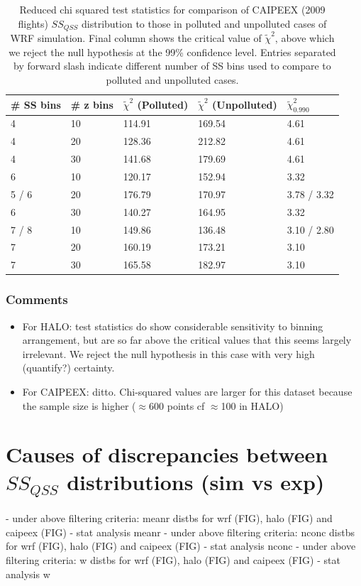 \documentclass{article}
\begin{document}
\begin{table}[ht]
\centering
\begin{tabular}{@{}lllll@{}}
\toprule
\textbf{\# SS bins} & \textbf{\# z bins} & \textbf{$\tilde\chi^2$ (Polluted)} & \textbf{$\tilde\chi^2$ (Unpolluted)} & \textbf{$\tilde\chi^2_{0.990}$} \\ \midrule
4 & 10 & 114.91 & 169.54 & 4.61 \\
4 & 20 & 128.36 & 212.82 & 4.61 \\
4 & 30 & 141.68 & 179.69 & 4.61 \\
6 & 10 & 120.17 & 152.94 & 3.32 \\
5 / 6 & 20 & 176.79 & 170.97 & 3.78 / 3.32 \\
6 & 30 & 140.27 & 164.95 & 3.32 \\
7 / 8 & 10 & 149.86 & 136.48 & 3.10 / 2.80 \\
7 & 20 & 160.19 & 173.21 & 3.10 \\
7 & 30 & 165.58 & 182.97 & 3.10 \\ \bottomrule
\end{tabular}
\caption{Reduced chi squared test statistics for comparison of CAIPEEX (2009 flights) $SS_{QSS}$ distribution to those in polluted and unpolluted cases of WRF simulation. Final column shows the critical value of $\tilde\chi^2$, above which we reject the null hypothesis at the 99\% confidence level. Entries separated by forward slash indicate different number of SS bins used to compare to polluted and unpolluted cases.}
\label{caipeexchisqtable}
\end{table}

\clearpage
\newpage

\subsubsection{Comments}
\begin{itemize}
	\item For HALO: test statistics do show considerable sensitivity to binning arrangement, but are so far above the critical values that this seems largely irrelevant. We reject the null hypothesis in this case with very high (quantify?) certainty.
	\item For CAIPEEX: ditto. Chi-squared values are larger for this dataset because the sample size is higher ($\approx$600 points cf $\approx$100 in HALO)
\end{itemize}

\section{Causes of discrepancies between $SS_{QSS}$ distributions (sim vs exp)}
- under above filtering criteria: meanr distbs for wrf (FIG), halo (FIG) and caipeex (FIG)
- stat analysis meanr 
- under above filtering criteria: nconc distbs for wrf (FIG), halo (FIG) and caipeex (FIG)
- stat analysis nconc 
- under above filtering criteria: w distbs for wrf (FIG), halo (FIG) and caipeex (FIG)
- stat analysis w 
\end{document}
